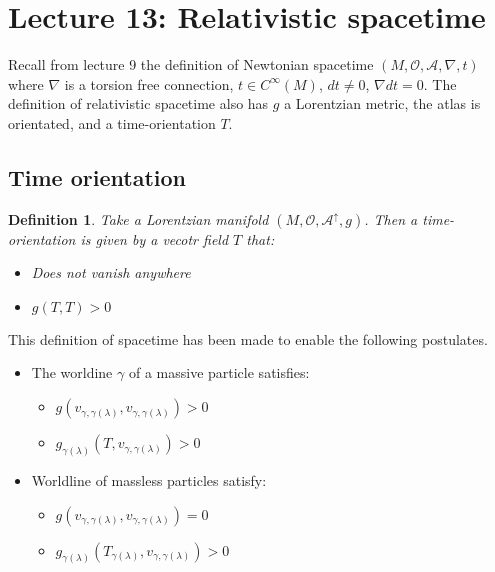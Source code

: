 \documentclass[10pt, oneside]{article}
\newtheorem{defn}{Definition}
\begin{document}
\section{Lecture 13: Relativistic spacetime \cite{Spacetime}}
Recall from lecture 9 the definition of Newtonian spacetime $(M,\mathcal{O},\mathcal{A},\nabla,t)$ where $\nabla$ is a torsion free connection, $t \in C^\infty (M)$, $dt \not = 0$, $\nabla dt = 0$.
The definition of relativistic spacetime also has $g$ a Lorentzian metric, the atlas is orientated, and a time-orientation $T$. 
\subsection{Time orientation}
\begin{defn}
Take a Lorentzian manifold $(M, \mathcal{O}, \mathcal{A}^\uparrow, g)$. Then a time-orientation is given by a vecotr field $T$ that:
\begin{itemize}
\item Does not vanish anywhere
\item $g(T,T) > 0$
\end{itemize}
\end{defn}
This definition of spacetime has been made to enable the following postulates. 
\begin{itemize}
\item The worldine $\gamma$ of a massive particle satisfies:
\begin{itemize}
\item $g(v_{\gamma,\gamma(\lambda)},v_{\gamma,\gamma(\lambda)})>0$
\item $g_{\gamma(\lambda)}(T,v_{\gamma,\gamma(\lambda)})>0$
\end{itemize}
\item Worldline of massless particles satisfy:
\begin{itemize}
\item $g(v_{\gamma,\gamma(\lambda)},v_{\gamma,\gamma(\lambda)})=0$
\item $g_{\gamma(\lambda)}(T_{\gamma(\lambda)},v_{\gamma,\gamma(\lambda)})>0$
\end{itemize}
\end{itemize}
\end{document}
